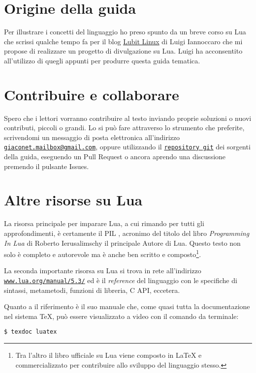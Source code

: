 \section{Origine della guida}

Per illustrare i concetti del linguaggio ho preso spunto da un breve corso su
Lua che scrissi qualche tempo fa per il blog
\href{http://parliamodi-ubuntu.blogspot.it}{Lubit Linux} di Luigi Iannoccaro
che mi propose di realizzare un progetto di divulgazione su Lua. Luigi ha
acconsentito all'utilizzo di quegli appunti per produrre questa guida tematica.


\section{Contribuire e collaborare}

Spero che i lettori vorranno contribuire al testo inviando proprie soluzioni o
nuovi contributi, piccoli o grandi. Lo si può fare attraverso lo strumento che
preferite, scrivendomi un messaggio di posta elettronica all'indirizzo
\href{mailto:giaconet.mailbox@gmail.com}{\texttt{giaconet.mailbox@gmail.com}},
oppure utilizzando il
\href{https://github.com/GuITeX/guidalua}{\texttt{repository git}} dei sorgenti
della guida, eseguendo un Pull Request o ancora aprendo una discussione premendo
il pulsante Issues.


\section{Altre risorse su Lua}

La risorsa principale per imparare Lua, a cui rimando per tutti gli
approfondimenti, è certamente il PIL \cite{PIL}, acronimo del titolo del libro
\emph{Programming In Lua} di Roberto Ierusalimschy il principale Autore di Lua.
Questo testo non solo è completo e autorevole ma è anche ben scritto e
composto\footnote{Tra l'altro il libro ufficiale su Lua viene composto in
\LaTeX{} e commercializzato per contribuire allo sviluppo del linguaggio
stesso.}.

La seconda importante risorsa su Lua si trova in rete all'indirizzo
\href{https://www.lua.org/manual/5.3/}{\texttt{www.lua.org/manual/5.3/}} ed è il
\emph{reference} del linguaggio \cite{web:luaref} con le specifiche di sintassi,
metametodi, funzioni di libreria, C API, eccetera.

Quanto a \LuaTeX{} il riferimento è il suo manuale \cite{prg:luatex} che, come
quasi tutta la documentazione nel sistema \TeX{}, può essere visualizzato a
video con il comando da terminale:
\begin{Verbatim}[numbers=none]
$ texdoc luatex
\end{Verbatim}


